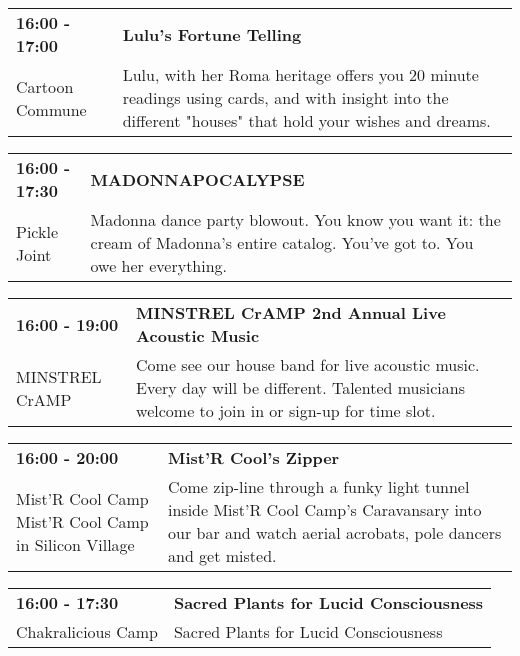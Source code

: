 \begin{tabular}{ p{1in} p{2.2in} }
    \textbf{16:00 - 17:00} & \textbf{Lulu's Fortune Telling} \\
    Cartoon Commune \newline  & Lulu, with her Roma heritage offers you 20 minute readings using cards, and with insight into the different "houses" that hold your wishes and dreams. \\
    \hline 
\end{tabular}
    
\begin{tabular}{ p{1in} p{2.2in} }
    \textbf{16:00 - 17:30} & \textbf{MADONNAPOCALYPSE} \\
    Pickle Joint \newline  & Madonna dance party blowout. You know you want it: the cream of Madonna's entire catalog. You've got to. You owe her everything. \\
    \hline 
\end{tabular}
    
\begin{tabular}{ p{1in} p{2.2in} }
    \textbf{16:00 - 19:00} & \textbf{MINSTREL CrAMP 2nd Annual Live Acoustic Music} \\
    MINSTREL CrAMP \newline  & Come see our house band for live acoustic music.  Every day will be different.  Talented musicians welcome to join in or sign-up for time slot. \\
    \hline 
\end{tabular}
    
\begin{tabular}{ p{1in} p{2.2in} }
    \textbf{16:00 - 20:00} & \textbf{Mist'R Cool's Zipper} \\
    Mist'R Cool Camp \newline Mist'R Cool Camp in Silicon Village & Come zip-line through a funky light tunnel inside Mist'R Cool Camp's Caravansary into our bar and watch aerial acrobats, pole dancers and get misted. \\
    \hline 
\end{tabular}
    
\begin{tabular}{ p{1in} p{2.2in} }
    \textbf{16:00 - 17:30} & \textbf{Sacred Plants for Lucid Consciousness} \\
    Chakralicious Camp \newline  & Sacred Plants for Lucid Consciousness \\
    \hline 
\end{tabular}
    
